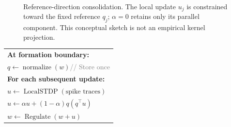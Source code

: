 \begin{figure}[H]

\centering
{}
\caption{Reference-direction consolidation. The local update $u_j$ is constrained toward the fixed reference $q_j$; $\alpha=0$ retains only its parallel component. This conceptual sketch is not an empirical kernel projection.}
\label{fig:method}
\end{figure}
\begin{algorithm}[H]

\caption{Reference-constrained hidden update}
\label{alg:reference-update}
\small
\begin{tabular}{@{}l@{}}
\textbf{At formation boundary:}\\
\quad $q\gets\operatorname{normalize}(w)$\quad\textcolor{gray}{// Store once}\\[5pt]
\textbf{For each subsequent update:}\\
\quad $u\gets\operatorname{LocalSTDP}(\text{spike traces})$\\
\quad $u\gets\alpha u+(1-\alpha)q(q^{\top}u)$\\
\quad $w\gets\operatorname{Regulate}(w+u)$
\end{tabular}
\end{algorithm}
